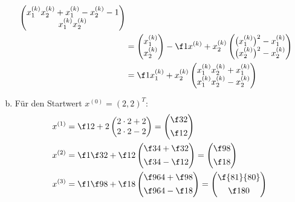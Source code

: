 \documentclass[a4paper]{scrartcl}
\begin{document}
\begin{aufgabe}
\begin{enumerate}[a)]
\begin{align*}
\begin{pmatrix}
					x_1^{(k)} x_2^{(k)} + x_1^{(k)} - x_2^{(k)} - 1 \\
					x_1^{(k)} x_2^{(k)}
				\end{pmatrix} \\ 
				&= \begin{pmatrix}
					x_1^{(k)} \\ x_2^{(k)}
				\end{pmatrix} - \f 1{x^{(k)} + x_2^{(k)}} \begin{pmatrix}
					\big(x_1^{(k)}\big)^2 - x_1^{(k)} \\
					\big(x_2^{(k)}\big)^2 - x_2^{(k)}
				\end{pmatrix}  \\
				&= \f 1{x_1^{(k)} + x_2^{(k)}} \begin{pmatrix}
					x_1^{(k)} x_2^{(k)} + x_1^{(k)} \\
					x_1^{(k)} x_2^{(k)} - x_2^{(k)} \\
				\end{pmatrix}
			\end{align*}
		\item
			Für den Startwert $x^{(0)} = (2,2)^T$:
			\begin{align*}
				x^{(1)} &= \f 1{2+2} \begin{pmatrix}
					2 \cdot 2 + 2 \\
					2 \cdot 2 - 2
				\end{pmatrix} = \begin{pmatrix}
					\f 32 \\[0.4em]
					\f 12
				\end{pmatrix} \\
				x^{(2)} &= \f 1{\f 32 + \f 12} \begin{pmatrix}
					\f 34 + \f 32 \\[0.4em]
					\f 34 - \f 12
				\end{pmatrix} = \begin{pmatrix}
					\f 98 \\[0.4em]
					\f 18
				\end{pmatrix}\\
				x^{(3)} &= \f 1{\f 98 + \f 18} \begin{pmatrix}
					\f 9{64} + \f 98 \\[0.4em]
					\f 9{64} - \f 18
				\end{pmatrix} = \begin{pmatrix}
					\f {81}{80} \\[0.4em]
					\f 1{80}
				\end{pmatrix}
			\end{align*}

\end{enumerate}
\end{aufgabe}
\end{document}
